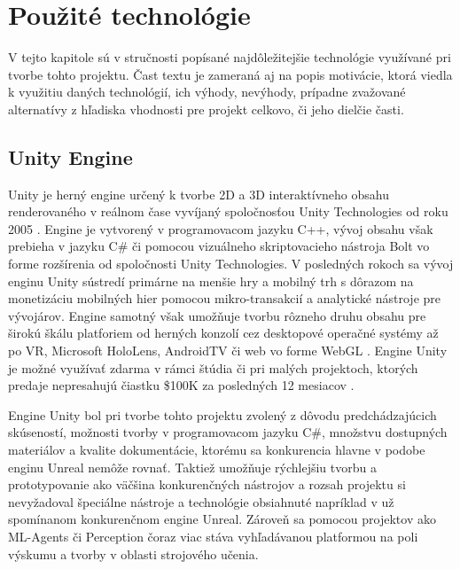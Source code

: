 \documentclass[slovak, master]{diploma}
\begin{document}
\chapter{Použité technológie}
\label{sec:Tech}
V tejto kapitole sú v stručnosti popísané najdôležitejšie technológie využívané pri tvorbe tohto projektu. Čast textu je zameraná aj na popis motivácie, ktorá viedla k využitiu daných technológií, ich výhody, nevýhody, prípadne zvažované alternatívy z hľadiska vhodnosti pre projekt celkovo, či jeho dielčie časti.

\section{Unity Engine}
\label{sec:Unity}
Unity je herný engine určený k tvorbe 2D a 3D interaktívneho obsahu renderovaného v reálnom čase vyvíjaný spoločnosťou Unity Technologies od roku 2005 \cite{Unity}. Engine je vytvorený v programovacom jazyku C++, vývoj obsahu však prebieha v jazyku C\# či pomocou vizuálneho skriptovacieho nástroja Bolt vo forme rozšírenia od spoločnosti Unity Technologies. V posledných rokoch sa vývoj enginu Unity sústredí primárne na menšie hry a mobilný trh s dôrazom na monetizáciu mobilných hier pomocou mikro-transakcií a analytické nástroje pre vývojárov. Engine samotný však umožňuje tvorbu rôzneho druhu obsahu pre širokú škálu platforiem od herných konzolí cez desktopové operačné systémy až po VR, Microsoft HoloLens, AndroidTV či web vo forme WebGL \cite{UnityMultiplatform}. Engine Unity je možné využívať zdarma v rámci štúdia či pri malých projektoch, ktorých predaje nepresahujú čiastku \$100K za posledných 12 mesiacov \cite{UnityPersonal}.

Engine Unity bol pri tvorbe tohto projektu zvolený z dôvodu predchádzajúcich skúseností, možnosti tvorby v programovacom jazyku C\#, množstvu dostupných materiálov a kvalite dokumentácie, ktorému sa konkurencia hlavne v podobe enginu Unreal nemôže rovnať. Taktiež umožňuje rýchlejšiu tvorbu a prototypovanie ako väčšina konkurenčných nástrojov a rozsah projektu si nevyžadoval špeciálne nástroje a technológie obsiahnuté napríklad v už spomínanom konkurenčnom engine Unreal. Zároveň sa pomocou projektov ako ML-Agents či Perception čoraz viac stáva vyhľadávanou platformou na poli výskumu a tvorby v oblasti strojového učenia.
\end{document}
